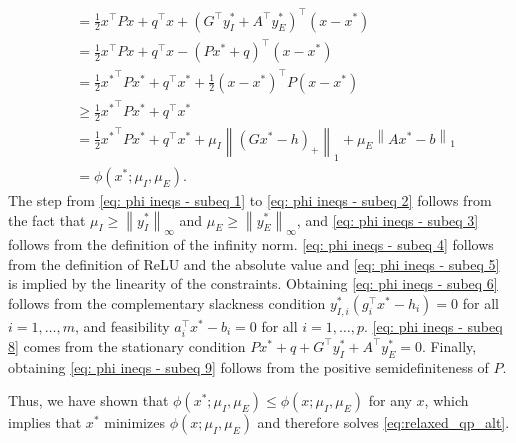 \documentclass{article} %
\newcommand{\norm}[1]{\left\lVert#1\right\rVert}
\begin{document}
\begin{subequations}
\begin{align}
    \label{eq: phi ineqs - subeq 6}
    \\
    &= \frac{1}{2} x^\top P x + q^\top x + (G^\top y_I^* + A^\top y_E^*)^\top (x - x^*)
    \label{eq: phi ineqs - subeq 7}
    \\
    &= \frac{1}{2} x^\top P x + q^\top x - (Px^* + q)^\top (x - x^*)
    \label{eq: phi ineqs - subeq 8}
    \\
    &= \frac{1}{2} {x^*}^\top P x^* + q^\top x^* + \frac{1}{2} (x - x^*)^\top P (x - x^*)
    \\
    &\geq \frac{1}{2} {x^*}^\top P x^* + q^\top x^*
    \label{eq: phi ineqs - subeq 9}
    \\
    &= \frac{1}{2} {x^*}^\top P x^* + q^\top x^* + \mu_I \norm{(Gx^* - h)_+}_1 + \mu_E \norm{Ax^* - b}_1
    \label{eq: phi ineqs - subeq 10}
    \\
    &= \phi(x^*; \mu_I, \mu_E).
    \label{eq: phi ineqs - subeq 11}
\end{align}
\label{eq: phi ineqs}%
\end{subequations}
%
The step from \cref{eq: phi ineqs - subeq 1} to \cref{eq: phi ineqs - subeq 2} follows from the fact that $\mu_I \geq \norm{y_I^*}_\infty$ and $\mu_E \geq \norm{y_E^*}_\infty$, and \cref{eq: phi ineqs - subeq 3} follows from the definition of the infinity norm.
\cref{eq: phi ineqs - subeq 4} follows from the definition of ReLU and the absolute value and \cref{eq: phi ineqs - subeq 5} is implied by the linearity of the constraints.
Obtaining \cref{eq: phi ineqs - subeq 6} follows from the complementary slackness condition $y_{I,i}^* (g_i^\top x^* - h_i) = 0$ for all $i = 1, \ldots, m$, and feasibility $a_i^\top x^* - b_i = 0$ for all $i = 1, \ldots, p$.
\cref{eq: phi ineqs - subeq 8} comes from the stationary condition $Px^* + q + G^\top y_I^* + A^\top y_E^* = 0$.
Finally, obtaining \cref{eq: phi ineqs - subeq 9} follows from the positive semidefiniteness of $P$.

Thus, we have shown that $\phi(x^*; \mu_I, \mu_E) \leq \phi(x; \mu_I, \mu_E)$ for any $x$, which implies that $x^*$ minimizes $\phi(x; \mu_I, \mu_E)$ and therefore solves \cref{eq:relaxed_qp_alt}.
\end{document}
